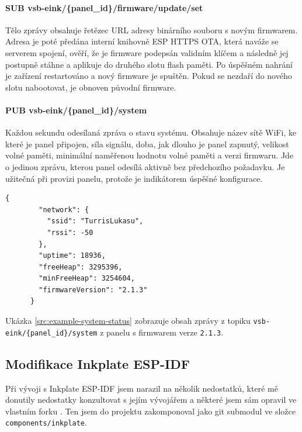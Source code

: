 \paragraph*{SUB vsb-eink/\{panel\_id\}/firmware/update/set}
Tělo zprávy obsahuje řetězec URL adresy binárního souboru s novým firmwarem. Adresa je poté předána interní knihovně ESP HTTPS OTA, která naváže se serverem spojení, ověří, že je firmware podepsán validním klíčem a následně jej postupně stáhne a aplikuje do druhého slotu flash paměti. Po úspěšném nahrání je zařízení restartováno a nový firmware je spuštěn. Pokud se nezdaří do nového slotu nabootovat, je obnoven původní firmware.

\paragraph*{PUB vsb-eink/\{panel\_id\}/system}
Každou sekundu odesílaná zpráva o stavu systému. Obsahuje název sítě WiFi, ke které je panel připojen, síla signálu, doba, jak dlouho je panel zapnutý, velikost volné paměti, minimální naměřenou hodnotu volné paměti a verzi firmwaru. Jde o jedinou zprávu, kterou panel odesílá aktivně bez předchozího požadavku. Je užitečná při provizi panelu, protože je indikátorem úspěšné konfigurace.

\begin{lstlisting}[label=src:example-system-status,caption={Ukázka zprávy stavu systému}]
    {
        "network": {
          "ssid": "TurrisLukasu",
          "rssi": -50
        },
        "uptime": 18936,
        "freeHeap": 3295396,
        "minFreeHeap": 3254604,
        "firmwareVersion": "2.1.3"
      }
\end{lstlisting}

Ukázka \ref{src:example-system-status} zobrazuje obsah zprávy z topiku \lstinline|vsb-eink/{panel_id}/system| z panelu s firmwarem verze \verb|2.1.3|.

\subsection{Modifikace Inkplate ESP-IDF}
Při vývoji s Inkplate ESP-IDF jsem narazil na několik nedostatků, které mě donutily nedostatky konzultovat s jejím vývojářem a některé jsem sám opravil ve vlastním forku \cite{TajnymagESPIDFInkPlateESPIDFInkPlate}. Ten jsem do projektu zakomponoval jako git submodul ve složce \verb|components/inkplate|.

